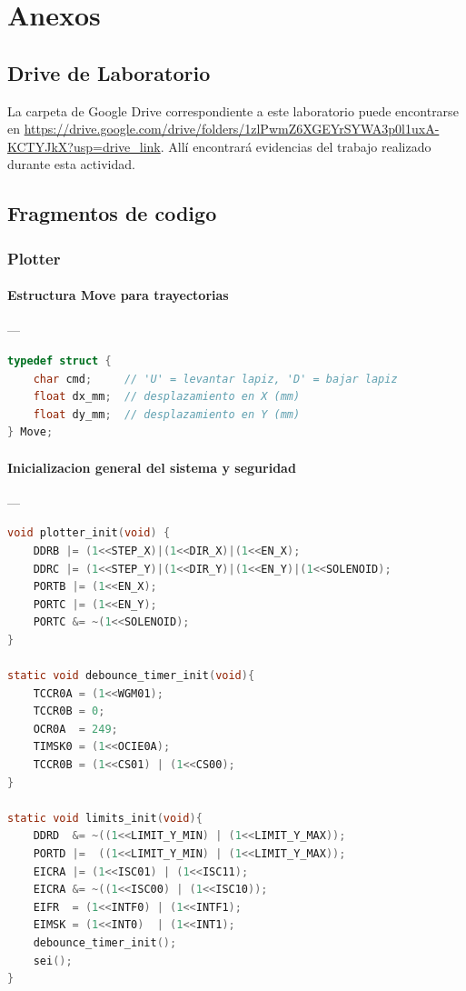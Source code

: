 \section{Anexos}

\subsection{Drive de Laboratorio}
La carpeta de Google Drive correspondiente a este laboratorio puede encontrarse en \url{https://drive.google.com/drive/folders/1zlPwmZ6XGEYrSYWA3p0l1uxA-KCTYJkX?usp=drive_link}. Allí encontrará evidencias del trabajo realizado durante esta actividad.

\subsection{Fragmentos de codigo}






\subsubsection{Plotter}

\paragraph{Estructura Move para trayectorias}\label{anexo:P1_move_struct}---\\
\begin{lstlisting}[language=C, caption={Estructura Move utilizada para representar trayectorias en formato vectorial.}]
typedef struct {
    char cmd;     // 'U' = levantar lapiz, 'D' = bajar lapiz
    float dx_mm;  // desplazamiento en X (mm)
    float dy_mm;  // desplazamiento en Y (mm)
} Move;
\end{lstlisting}

\paragraph{Inicializacion general del sistema y seguridad}\label{anexo:P2_plotter_init}---\\
\begin{lstlisting}[language=C, caption={Inicializacion de pines, interrupciones y temporizador de antirrebote.}]
void plotter_init(void) {
    DDRB |= (1<<STEP_X)|(1<<DIR_X)|(1<<EN_X);
    DDRC |= (1<<STEP_Y)|(1<<DIR_Y)|(1<<EN_Y)|(1<<SOLENOID);
    PORTB |= (1<<EN_X);
    PORTC |= (1<<EN_Y);
    PORTC &= ~(1<<SOLENOID);
}

static void debounce_timer_init(void){
    TCCR0A = (1<<WGM01);
    TCCR0B = 0;
    OCR0A  = 249;
    TIMSK0 = (1<<OCIE0A);
    TCCR0B = (1<<CS01) | (1<<CS00);
}

static void limits_init(void){
    DDRD  &= ~((1<<LIMIT_Y_MIN) | (1<<LIMIT_Y_MAX));
    PORTD |=  ((1<<LIMIT_Y_MIN) | (1<<LIMIT_Y_MAX));
    EICRA |= (1<<ISC01) | (1<<ISC11);
    EICRA &= ~((1<<ISC00) | (1<<ISC10));
    EIFR  = (1<<INTF0) | (1<<INTF1);
    EIMSK = (1<<INT0)  | (1<<INT1);
    debounce_timer_init();
    sei();
}
\end{lstlisting}

